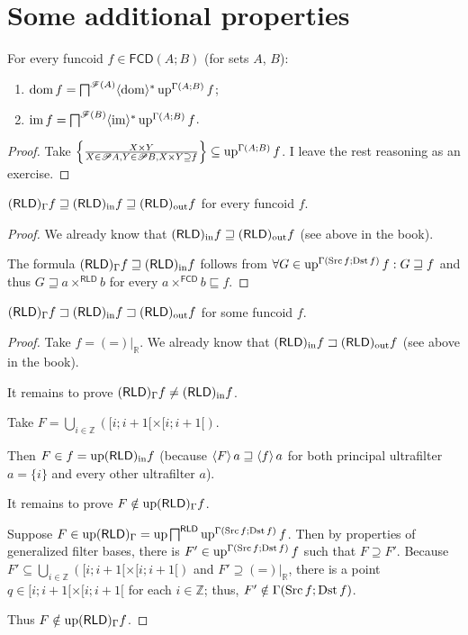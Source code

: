 \section{Some additional properties}
\begin{prop}
For every funcoid $f\in\mathsf{FCD}(A;B)$ (for sets $A$, $B$):
\begin{enumerate}
\item $\operatorname{dom} f=\bigsqcap^{\mathscr{F}(A)}\langle\operatorname{dom}\rangle^{\ast}\operatorname{up}^{\Gamma(A;B)}f$;
\item $\operatorname{im} f=\bigsqcap^{\mathscr{F}(B)}\langle\operatorname{im}\rangle^{\ast}\operatorname{up}^{\Gamma(A;B)}f$.
\end{enumerate}
\end{prop}
\begin{proof}
Take $\left\{ \frac{X\times Y}{X\in\mathscr{P} A,Y\in\mathscr{P} B,X\times Y\supseteq f}\right\}\subseteq\operatorname{up}^{\Gamma(A;B)}f$.
I leave the rest reasoning as an exercise.\end{proof}
\begin{prop}
$(\mathsf{RLD})_{\Gamma}f\sqsupseteq(\mathsf{RLD})_{\mathrm{in}} f\sqsupseteq(\mathsf{RLD})_{\mathrm{out}} f$
for every funcoid $f$.\end{prop}
\begin{proof}
We already know that $(\mathsf{RLD})_{\mathrm{in}} f\sqsupseteq(\mathsf{RLD})_{\mathrm{out}} f$ (see above
in the book).

The formula $(\mathsf{RLD})_{\Gamma}f\sqsupseteq(\mathsf{RLD})_{\mathrm{in}} f$ follows
from $\forall G\in\operatorname{up}^{\Gamma(\operatorname{Src} f;\operatorname{Dst} f)}f:G\sqsupseteq f$
and thus $G\sqsupseteq a\times^{\mathsf{RLD}}b$ for every $a\times^{\mathsf{FCD}}b\sqsubseteq f$.\end{proof}
\begin{example}
\label{three-rld}$(\mathsf{RLD})_{\Gamma}f\sqsupset(\mathsf{RLD})_{\mathrm{in}} f\sqsupset(\mathsf{RLD})_{\mathrm{out}} f$
for some funcoid $f$.\end{example}
\begin{proof}
Take $f={(\mathord{=})}|_{\mathbb{R}}$. We already know that $(\mathsf{RLD})_{\mathrm{in}} f\sqsupset(\mathsf{RLD})_{\mathrm{out}} f$
(see above in the book).

It remains to prove $(\mathsf{RLD})_{\Gamma}f\neq(\mathsf{RLD})_{\mathrm{in}} f$.

Take $F=\bigcup_{i\in\mathbb{Z}}([i;i+1[\times[i;i+1[)$.

Then $F\in f=\operatorname{up}(\mathsf{RLD})_{\mathrm{in}} f$ (because $\left\langle F\right\rangle a\sqsupseteq\left\langle f\right\rangle a$
for both principal ultrafilter $a=\{i\}$ and every other ultrafilter
$a$).

It remains to prove $F\notin\operatorname{up}(\mathsf{RLD})_{\Gamma}f$.

Suppose $F\in\operatorname{up}(\mathsf{RLD})_{\Gamma}=\operatorname{up}\bigsqcap^{\mathsf{RLD}}\operatorname{up}^{\Gamma(\operatorname{Src} f;\operatorname{Dst} f)}f$.
Then by properties of generalized filter bases, there is $F'\in\operatorname{up}^{\Gamma(\operatorname{Src} f;\operatorname{Dst} f)}f$
such that $F\supseteq F'$. Because $F'\subseteq\bigcup_{i\in\mathbb{Z}}([i;i+1[\times[i;i+1[)$
and $F'\supseteq{(\mathord{=})}|_{\mathbb{R}}$, there is a point
$q\in[i;i+1[\times[i;i+1[$ for each $i\in\mathbb{Z}$; thus, $F'\notin\Gamma(\operatorname{Src} f;\operatorname{Dst} f)$.

Thus $F\notin\operatorname{up}(\mathsf{RLD})_{\Gamma}f$.\end{proof}
